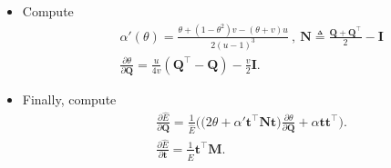\begin{itemize}
    \item Compute 
    \begin{eqnarray}
       &&  \alpha'(\theta) = \frac{ \theta {+} (1 {-}\theta^2) v{-} (\theta+v)u}{2(u-1)^3} \ , \ \mathbf{N} {\triangleq} \frac{\mathbf{Q}{+}\mathbf{Q}^\top}{2}{-}\mathbf{I} \nonumber \\
       && \frac{\partial \theta}{\partial \mathbf{Q}} = \frac{u}{4v}(\mathbf{Q}^{\top}-\mathbf{Q}) - \frac{v}{2}\mathbf{I}.
    \end{eqnarray}
    \item Finally, compute 
    \begin{eqnarray}
        && \frac{\partial \widehat{E}}{\partial \mathbf{Q}} = \frac{1}{\widehat{E}}\Bigg(\big(2\theta + \alpha' \mathbf{t}^{\top}\mathbf{N}\mathbf{t} \big) \frac{\partial \theta}{\partial \mathbf{Q}} + \alpha \mathbf{t}\mathbf{t}^{\top}\Bigg). \nonumber \\
        && \frac{\partial \widehat{E}}{\partial \mathbf{t}} = \frac{1}{\widehat{E}} \mathbf{t}^{\top} \mathbf{M} .
    \end{eqnarray}
\end{itemize}
